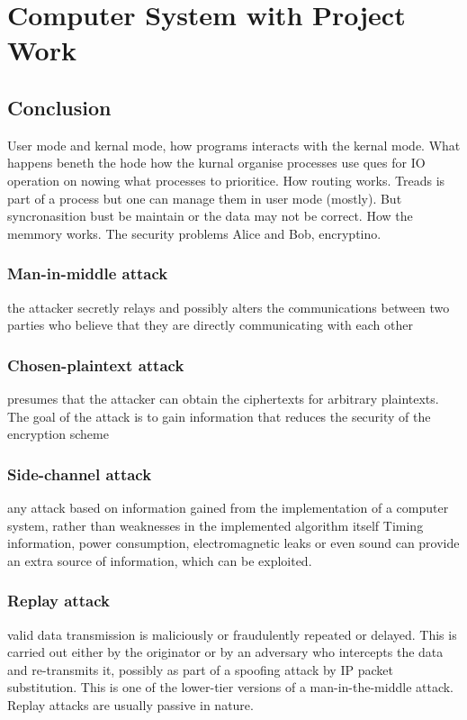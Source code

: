 \chapter{Computer System with Project Work}

\newpage

\section{Conclusion}
User mode and kernal mode, how programs interacts with the kernal mode. What happens
beneth the hode how the kurnal organise processes use ques for IO operation on nowing
what processes to prioritice. How routing works. Treads is part of a process but one can
manage them in user mode (mostly). But syncronasition bust be maintain or the data may not
be correct. How the memmory works. The security problems Alice and Bob, encryptino.
\subsection{Man-in-middle attack}
the attacker secretly relays and possibly alters the communications between two parties who believe that they are directly communicating with each other
\subsection{Chosen-plaintext attack}
presumes that the attacker can obtain the ciphertexts for arbitrary plaintexts. The goal of the attack is to gain information that reduces the security of the encryption scheme
\subsection{Side-channel attack}
any attack based on information gained from the implementation of a computer system, rather than weaknesses in the implemented algorithm itself
Timing information, power consumption, electromagnetic leaks or even sound can provide an extra source of information, which can be exploited.
\subsection{Replay attack}
valid data transmission is maliciously or fraudulently repeated or delayed. This is carried out either by the originator or by an adversary who intercepts the data and re-transmits it, possibly as part of a spoofing attack by IP packet substitution. This is one of the lower-tier versions of a man-in-the-middle attack. Replay attacks are usually passive in nature.
